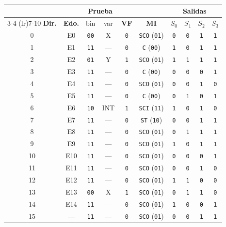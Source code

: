 \begin{tabular}{@{}c c c c c c cccc@{}}
\toprule
 & & \multicolumn{2}{c}{\textbf{Prueba}} & & & \multicolumn{4}{c}{\textbf{Salidas}} \\
\cmidrule(lr){3-4} \cmidrule(lr){7-10}
\textbf{Dir.} & \textbf{Edo.} & bin & var & \textbf{VF} & \textbf{MI} & $S_0$ & $S_1$ & $\overline{S_2}$ & $\overline{S_3}$ \\
\midrule
0 & E0 & \texttt{00} & X & \texttt{0} & \texttt{SCO} (\texttt{01}) & \texttt{0} & \texttt{0} & \texttt{1} & \texttt{1} \\
1 & E1 & \texttt{11} & --- & \texttt{0} & \texttt{C} (\texttt{00}) & \texttt{1} & \texttt{0} & \texttt{1} & \texttt{1} \\
2 & E2 & \texttt{01} & Y & \texttt{1} & \texttt{SCO} (\texttt{01}) & \texttt{1} & \texttt{1} & \texttt{1} & \texttt{1} \\
3 & E3 & \texttt{11} & --- & \texttt{0} & \texttt{C} (\texttt{00}) & \texttt{0} & \texttt{0} & \texttt{0} & \texttt{1} \\
4 & E4 & \texttt{11} & --- & \texttt{0} & \texttt{SCO} (\texttt{01}) & \texttt{0} & \texttt{0} & \texttt{1} & \texttt{0} \\
5 & E5 & \texttt{11} & --- & \texttt{0} & \texttt{C} (\texttt{00}) & \texttt{0} & \texttt{1} & \texttt{0} & \texttt{1} \\
6 & E6 & \texttt{10} & INT & \texttt{1} & \texttt{SCI} (\texttt{11}) & \texttt{1} & \texttt{0} & \texttt{1} & \texttt{0} \\
7 & E7 & \texttt{11} & --- & \texttt{0} & \texttt{ST} (\texttt{10}) & \texttt{0} & \texttt{0} & \texttt{1} & \texttt{1} \\
8 & E8 & \texttt{11} & --- & \texttt{0} & \texttt{SCO} (\texttt{01}) & \texttt{0} & \texttt{1} & \texttt{1} & \texttt{1} \\
9 & E9 & \texttt{11} & --- & \texttt{0} & \texttt{SCO} (\texttt{01}) & \texttt{1} & \texttt{0} & \texttt{1} & \texttt{1} \\
10 & E10 & \texttt{11} & --- & \texttt{0} & \texttt{SCO} (\texttt{01}) & \texttt{0} & \texttt{0} & \texttt{0} & \texttt{1} \\
11 & E11 & \texttt{11} & --- & \texttt{0} & \texttt{SCO} (\texttt{01}) & \texttt{0} & \texttt{0} & \texttt{1} & \texttt{0} \\
12 & E12 & \texttt{11} & --- & \texttt{0} & \texttt{SCO} (\texttt{01}) & \texttt{1} & \texttt{1} & \texttt{0} & \texttt{0} \\
13 & E13 & \texttt{00} & X & \texttt{1} & \texttt{SCO} (\texttt{01}) & \texttt{0} & \texttt{1} & \texttt{1} & \texttt{0} \\
14 & E14 & \texttt{11} & --- & \texttt{0} & \texttt{SCO} (\texttt{01}) & \texttt{1} & \texttt{0} & \texttt{0} & \texttt{1} \\
\midrule
15 & --- & \texttt{11} & --- & \texttt{0} & \texttt{SCO} (\texttt{01}) & \texttt{0} & \texttt{0} & \texttt{1} & \texttt{1} \\
\bottomrule
\end{tabular}
